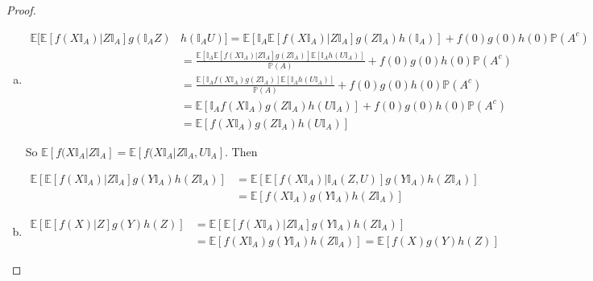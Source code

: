 \documentclass[12pt]{article}
\newcommand{\mb}{\mathbb}
\newcommand{\pr}{\mb{P}}							%
\newcommand{\ex}[1]{\mb{E}\left[#1\right]}			%
\newcommand{\Xf}{X}									%
\newcommand{\Xg}{Y}									%
\newcommand{\Xh}{Z}									%
\newcommand{\typset}{A}							%
\begin{document}
\begin{proof}
\begin{enumerate}[(a)]
By linearity, this also holds for all bounded and measurable \(f,g\) and \(h\) with no restrictions on \(f(0),g(0),h(0)\), so the proof is complete.

\item 

\begin{align*}
\mb{E}\bigg[\ex{f(\Xf\mb{I}_\typset)| \Xh\mb{I}_\typset}g(\mb{I}_\typset\Xh)&h(\mb{I}_\typset U)\bigg] = \ex{\mb{I}_\typset\ex{f(\Xf\mb{I}_\typset)|\Xh\mb{I}_\typset}g(\Xh\mb{I}_\typset)h(\mb{I}_\typset)} + f(0)g(0)h(0)\pr(\typset^c)\\
&=\frac{\ex{\mb{I}_\typset\ex{f(\Xf\mb{I}_\typset)|\Xh\mb{I}_\typset}g(\Xh\mb{I}_\typset)}\ex{\mb{I}_\typset h(U\mb{I}_\typset)}}{\pr(\typset)} + f(0)g(0)h(0)\pr(\typset^c)\\
&=\frac{\ex{\mb{I}_\typset f(\Xf\mb{I}_\typset)g(\Xh\mb{I}_\typset)}\ex{\mb{I}_\typset h(U\mb{I}_\typset)}}{\pr(\typset)} + f(0)g(0)h(0)\pr(\typset^c)\\
&=\ex{\mb{I}_\typset f(\Xf\mb{I}_\typset)g(\Xh\mb{I}_\typset)h(U\mb{I}_\typset)} + f(0)g(0)h(0)\pr(\typset^c)\\
&= \ex{f(\Xf\mb{I}_\typset)g(\Xh\mb{I}_\typset)h(U\mb{I}_\typset)}
\end{align*}

So \(\ex{f(\Xf\mb{I}_\typset|\Xh\mb{I}_\typset} = \ex{f(\Xf\mb{I}_\typset|\Xh\mb{I}_\typset,U\mb{I}_\typset}\). Then 

\begin{align*}
\ex{\ex{f(\Xf\mb{I}_\typset)|\Xh\mb{I}_\typset}g(\Xg\mb{I}_\typset)h(\Xh\mb{I}_\typset)} &= \ex{\ex{f(\Xf\mb{I}_\typset)|\mb{I}_\typset(\Xh,U)}g(\Xg\mb{I}_\typset)h(\Xh\mb{I}_\typset)}\\
&=\ex{f(\Xf\mb{I}_\typset)g(\Xg\mb{I}_\typset)h(\Xh\mb{I}_\typset)}
\end{align*}

\item 
\begin{align*}
\ex{\ex{f(\Xf)|\Xh}g(\Xg)h(\Xh)} &= \ex{\ex{f(\Xf\mb{I}_\typset)|\Xh\mb{I}_\typset}g(\Xg\mb{I}_\typset)h(\Xh\mb{I}_\typset)}\\
&= \ex{f(\Xf\mb{I}_\typset)g(\Xg\mb{I}_\typset)h(\Xh\mb{I}_\typset)} = \ex{f(\Xf)g(\Xg)h(\Xh)}
\end{align*}
\end{enumerate}
\end{proof}

\newpage


\end{document}
